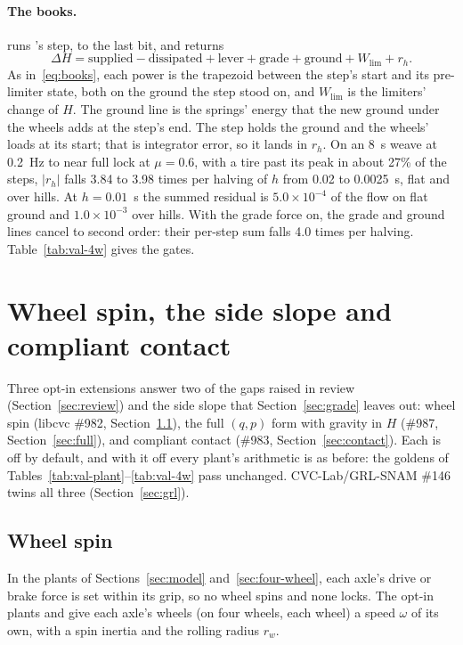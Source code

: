\documentclass[11pt]{article}
\theoremstyle{remark}
\begin{document}
\paragraph{The books.}  runs 's step, to the last bit, and
returns
\begin{equation}
  \Delta H=\text{supplied}-\text{dissipated}+\text{lever}+\text{grade}+\text{ground}+W_{\mathrm{lim}}+r_h .
  \label{eq:4w-books}
\end{equation}
As in~\eqref{eq:books}, each power is the trapezoid between the step's start and its pre-limiter
state, both on the ground the step stood on, and $W_{\mathrm{lim}}$ is the limiters' change of $H$.
The ground line is the springs' energy that the new ground under the wheels adds at the step's end.
The step holds the ground and the wheels' loads at its start; that is integrator error, so it lands
in $r_h$. On an 8~s weave at 0.2~Hz to near full lock at $\mu=0.6$, with a tire past its peak in
about 27\% of the steps, $\lvert r_h\rvert$ falls 3.84 to 3.98 times per halving of $h$ from 0.02 to
0.0025~s, flat and over hills. At $h=0.01$~s the summed residual is $5.0\times10^{-4}$ of the flow
on flat ground and $1.0\times10^{-3}$ over hills. With the grade force on, the grade and ground
lines cancel to second order: their per-step sum falls 4.0 times per halving.
Table~\ref{tab:val-4w} gives the gates.

\section{Wheel spin, the side slope and compliant contact}
\label{sec:ext}

Three opt-in extensions answer two of the gaps raised in review (Section~\ref{sec:review}) and the
side slope that Section~\ref{sec:grade} leaves out: wheel spin (libcvc \#982,
Section~\ref{sec:spin}), the full $(q,p)$ form with gravity in $H$ (\#987, Section~\ref{sec:full}),
and compliant contact (\#983, Section~\ref{sec:contact}). Each is off by default, and with it off
every plant's arithmetic is as before: the goldens of Tables~\ref{tab:val-plant}--\ref{tab:val-4w}
pass unchanged. CVC-Lab/GRL-SNAM \#146 twins all three (Section~\ref{sec:grl}).

\subsection{Wheel spin}
\label{sec:spin}
In the plants of Sections~\ref{sec:model} and~\ref{sec:four-wheel}, each axle's drive or brake
force is set within its grip, so no wheel spins and none locks. The opt-in plants
 and  give each axle's wheels (on four
wheels, each wheel) a speed $\omega$ of its own, with a spin inertia and the rolling radius $r_w$.
\end{document}
